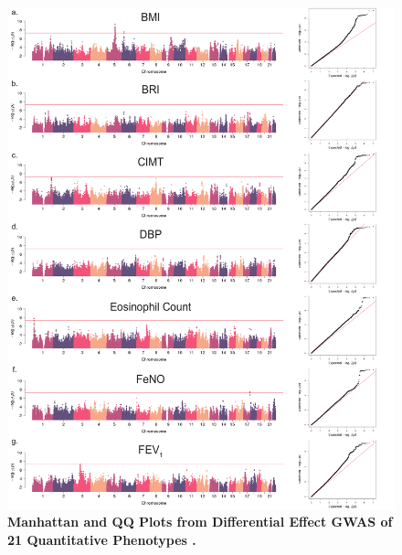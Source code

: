 \begin{figure}[!htb]
	\centering
	\includegraphics[width=5in]{img/ch02/fig-s7a.pdf}
	\caption[Manhattan and QQ Plots from Differential Effect GWAS of 21 Quantitative Phenotypes. ]{\textbf{Manhattan and QQ Plots from Differential Effect GWAS of 21 Quantitative Phenotypes .} }
	\label{fig:fig-s7a}
\end{figure}



